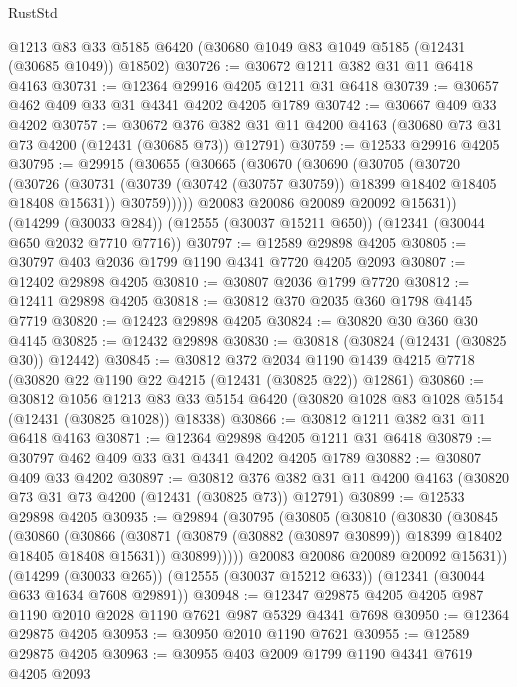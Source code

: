 \begin{lexlean}{RustStd}
\begin{coremodule}
    @1213
    @83
    @33
    @5185
    @6420
    (@30680 @1049 @83 @1049 @5185 (@12431 (@30685 @1049)) @18502)
@30726 := @30672 @1211 @382 @31 @11 @6418 @4163
@30731 := @12364 @29916 @4205 @1211 @31 @6418
@30739 := @30657 @462 @409 @33 @31 @4341 @4202 @4205 @1789
@30742 := @30667 @409 @33 @4202
@30757 := @30672
    @376
    @382
    @31
    @11
    @4200
    @4163
    (@30680 @73 @31 @73 @4200 (@12431 (@30685 @73)) @12791)
@30759 := @12533 @29916 @4205
@30795 := @29915
    (@30655
      (@30665
        (@30670
          (@30690
            (@30705
              (@30720
                (@30726
                  (@30731 (@30739 (@30742 (@30757 @30759)) @18399 @18402 @18405 @18408 @15631))
                  @30759)))))
        @20083
        @20086
        @20089
        @20092
        @15631))
    (@14299 (@30033 @284))
    (@12555 (@30037 @15211 @650))
    (@12341 (@30044 @650 @2032 @7710 @7716))
@30797 := @12589 @29898 @4205
@30805 := @30797 @403 @2036 @1799 @1190 @4341 @7720 @4205 @2093
@30807 := @12402 @29898 @4205
@30810 := @30807 @2036 @1799 @7720
@30812 := @12411 @29898 @4205
@30818 := @30812 @370 @2035 @360 @1798 @4145 @7719
@30820 := @12423 @29898 @4205
@30824 := @30820 @30 @360 @30 @4145
@30825 := @12432 @29898
@30830 := @30818 (@30824 (@12431 (@30825 @30)) @12442)
@30845 := @30812
    @372
    @2034
    @1190
    @1439
    @4215
    @7718
    (@30820 @22 @1190 @22 @4215 (@12431 (@30825 @22)) @12861)
@30860 := @30812
    @1056
    @1213
    @83
    @33
    @5154
    @6420
    (@30820 @1028 @83 @1028 @5154 (@12431 (@30825 @1028)) @18338)
@30866 := @30812 @1211 @382 @31 @11 @6418 @4163
@30871 := @12364 @29898 @4205 @1211 @31 @6418
@30879 := @30797 @462 @409 @33 @31 @4341 @4202 @4205 @1789
@30882 := @30807 @409 @33 @4202
@30897 := @30812
    @376
    @382
    @31
    @11
    @4200
    @4163
    (@30820 @73 @31 @73 @4200 (@12431 (@30825 @73)) @12791)
@30899 := @12533 @29898 @4205
@30935 := @29894
    (@30795
      (@30805
        (@30810
          (@30830
            (@30845
              (@30860
                (@30866
                  (@30871 (@30879 (@30882 (@30897 @30899)) @18399 @18402 @18405 @18408 @15631))
                  @30899)))))
        @20083
        @20086
        @20089
        @20092
        @15631))
    (@14299 (@30033 @265))
    (@12555 (@30037 @15212 @633))
    (@12341 (@30044 @633 @1634 @7608 @29891))
@30948 := @12347 @29875 @4205 @4205 @987 @1190 @2010 @2028 @1190 @7621 @987 @5329 @4341 @7698
@30950 := @12364 @29875 @4205
@30953 := @30950 @2010 @1190 @7621
@30955 := @12589 @29875 @4205
@30963 := @30955 @403 @2009 @1799 @1190 @4341 @7619 @4205 @2093

\end{coremodule}
\end{lexlean}
